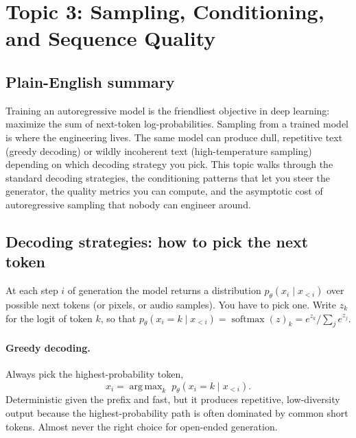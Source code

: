 \documentclass[11pt]{article}
\DeclareMathOperator*{\argmax}{arg\,max}
\theoremstyle{remark}
\begin{document}
\clearpage
\section{Topic 3: Sampling, Conditioning, and Sequence Quality}

\subsection{Plain-English summary}

Training an autoregressive model is the friendliest objective in deep learning: maximize the sum of next-token log-probabilities. Sampling from a trained model is where the engineering lives. The same model can produce dull, repetitive text (greedy decoding) or wildly incoherent text (high-temperature sampling) depending on which decoding strategy you pick. This topic walks through the standard decoding strategies, the conditioning patterns that let you steer the generator, the quality metrics you can compute, and the asymptotic cost of autoregressive sampling that nobody can engineer around.

\subsection{Decoding strategies: how to pick the next token}

At each step $i$ of generation the model returns a distribution $p_\theta(x_i \mid x_{<i})$ over possible next tokens (or pixels, or audio samples). You have to pick one. Write $z_k$ for the logit of token $k$, so that $p_\theta(x_i = k \mid x_{<i}) = \operatorname{softmax}(z)_k = e^{z_k} / \sum_j e^{z_j}$.

\paragraph{Greedy decoding.} Always pick the highest-probability token,
\begin{equation}
x_i = \argmax_k \; p_\theta(x_i = k \mid x_{<i}).
\end{equation}
Deterministic given the prefix and fast, but it produces repetitive, low-diversity output because the highest-probability path is often dominated by common short tokens. Almost never the right choice for open-ended generation.
\end{document}

